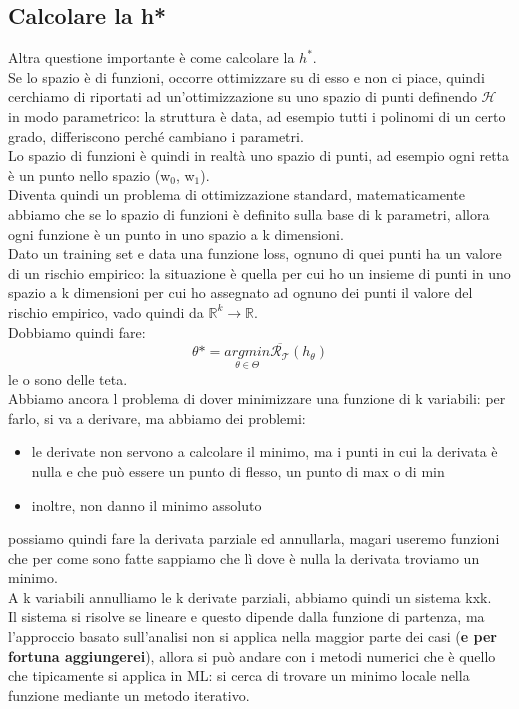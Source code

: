 \documentclass[12pt, oneside]{extbook}
\begin{document}
\subsection{Calcolare la h*}
Altra questione importante è come calcolare la $h^*$.\\Se lo spazio è di funzioni, occorre ottimizzare su di esso e non ci piace, quindi cerchiamo di riportati ad un'ottimizzazione su uno spazio di punti definendo $\mathscr{H}$ in modo parametrico: la struttura è data, ad esempio tutti i polinomi di un certo grado, differiscono perché cambiano i parametri.\\Lo spazio di funzioni è quindi in realtà uno spazio di punti, ad esempio ogni retta è un punto nello spazio (w$_0$, w$_1$).\\Diventa quindi un problema di ottimizzazione standard, matematicamente abbiamo che se lo spazio di funzioni è definito sulla base di k parametri, allora ogni funzione è un punto in uno spazio a k dimensioni.\\Dato un training set e data una funzione loss, ognuno di quei punti ha un valore di un rischio empirico: la situazione è quella per cui ho un insieme di punti in uno spazio a k dimensioni per cui ho assegnato ad ognuno dei punti il valore del rischio empirico, vado quindi da $\mathbb{R}^k \rightarrow \mathbb{R}$.\\Dobbiamo quindi fare:
\begin{equation}
	\theta* = \underset{\theta \in \Theta}{argmin} \overline{\mathscr{R}_{\mathscr{T}}}(h_{\theta})
\end{equation}
le o sono delle teta.\\Abbiamo ancora l problema di dover minimizzare una funzione di k variabili: per farlo, si va a derivare, ma abbiamo dei problemi:
\begin{itemize}
	\item le derivate non servono a calcolare il minimo, ma i punti in cui la derivata è nulla e che può essere un punto di flesso, un punto di max o di min
	\item inoltre, non danno il minimo assoluto
\end{itemize}
possiamo quindi fare la derivata parziale ed annullarla, magari useremo funzioni che per come sono fatte sappiamo che lì dove è nulla la derivata troviamo un minimo.\\A k variabili annulliamo le k derivate parziali, abbiamo quindi un sistema kxk.\\Il sistema si risolve se lineare e questo dipende dalla funzione di partenza, ma l'approccio basato sull'analisi non si applica nella maggior parte dei casi (\textbf{e per fortuna aggiungerei}), allora si può andare con i metodi numerici che è quello che tipicamente si applica in ML: si cerca di trovare un minimo locale nella funzione mediante un metodo iterativo.
\end{document}
